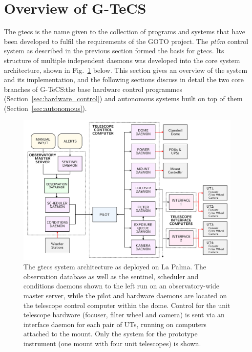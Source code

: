 
\section{Overview of G-TeCS}
\label{sec:gtecs}
\begin{colsection}


\begin{colsection}

The \gls{gtecs} is the name given to the collection of programs and systems that have been developed to fulfil the requirements of the GOTO project. The \textit{pt5m} control system as described in the previous section formed the basis for \gls{gtecs}. Its structure of multiple independent daemons was developed into the core system architecture, shown in Fig.~\ref{fig:flow} below. This section gives an overview of the system and its implementation, and the following sections discuss in detail the two core branches of G-TeCS:\@ the base hardware control programmes (Section~\ref{sec:hardware_control}) and autonomous systems built on top of them (Section~\ref{sec:autonomous}).

\begin{figure}[h]
\begin{center}
\includegraphics[width=\linewidth]{images/flow.pdf}
\end{center}
\caption[The G-TeCS system architecture]{The \gls{gtecs} system architecture as deployed on La Palma. The observation database as well as the sentinel, scheduler and conditions daemons shown to the left run on an observatory-wide master server, while the pilot and hardware daemons are located on the telescope control computer within the dome. Control for the unit telescope hardware (focuser, filter wheel and camera) is sent via an interface daemon for each pair of UTs, running on computers attached to the mount. Only the system for the prototype instrument (one mount with four unit telescopes) is shown.}
\label{fig:flow}
\end{figure}


\end{colsection}
\end{colsection}
